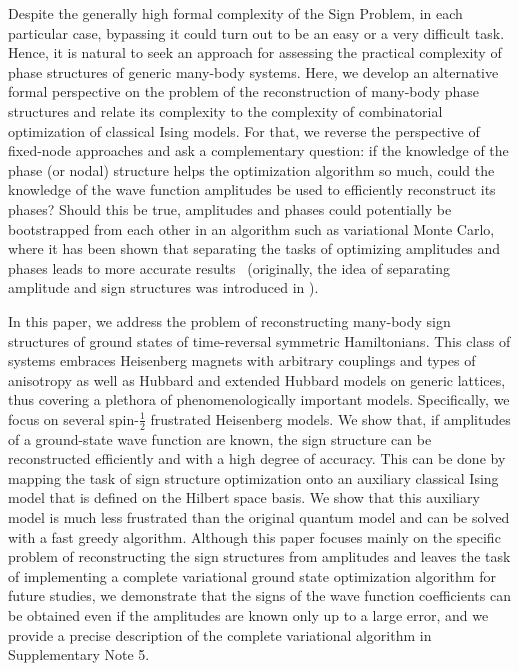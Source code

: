 Despite the generally high formal complexity of the Sign Problem, in each particular case, bypassing it could turn out to be an easy or a very difficult task. Hence, it is natural to seek an approach for assessing the practical complexity of phase structures of generic many-body systems. Here, we develop an alternative formal perspective on the problem of the reconstruction of many-body phase structures and relate its complexity to the complexity of combinatorial optimization of classical Ising models. For that, we reverse the perspective of fixed-node approaches and ask a complementary question: if the knowledge of the phase (or nodal) structure helps the optimization algorithm so much, could the knowledge of the wave function amplitudes be used to efficiently reconstruct its phases? Should this be true, amplitudes and phases could potentially be bootstrapped from each other in an algorithm such as variational Monte Carlo, where it has been shown that separating the tasks of optimizing amplitudes and phases leads to more accurate results~\cite{astrakhantsev2021} (originally, the idea of separating amplitude and sign structures was introduced in \cite{torlai2018neural}).

In this paper, we address the problem of reconstructing many-body sign structures of ground states of time-reversal symmetric Hamiltonians. This class of systems embraces Heisenberg magnets with arbitrary couplings and types of anisotropy as well as Hubbard and extended Hubbard models on generic lattices, thus covering a plethora of phenomenologically important models. Specifically, we focus on several spin-$\frac12$ frustrated Heisenberg models. We show that, if amplitudes of a ground-state wave function are known, the sign structure can be reconstructed efficiently and with a high degree of accuracy. This can be done by mapping the task of sign structure optimization onto an auxiliary classical Ising model that is defined on the Hilbert space basis. We show that this auxiliary model is much less frustrated than the original quantum model and can be solved with a fast greedy algorithm. Although this paper focuses mainly on the specific problem of reconstructing the sign structures from amplitudes and leaves the task of implementing a complete variational ground state optimization algorithm for future studies, we demonstrate that the signs of the wave function coefficients can be obtained even if the amplitudes are known only up to a large error, and we provide a precise description of the complete variational algorithm in Supplementary Note 5.

